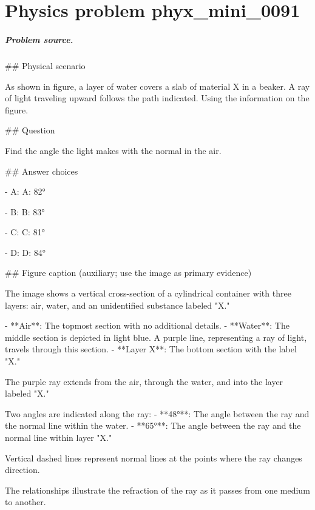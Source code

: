 
\chapter{Physics problem phyx\_mini\_0091}
\label{ch:PhyXMiniProblems_problem_phyx_mini_0091}

\paragraph{Problem source.}
\#\# Physical scenario

As shown in figure, a layer of water covers a slab of material X in a beaker. A ray of light traveling upward follows the path indicated. Using the information on the figure.

\#\# Question

Find the angle the light makes with the normal in the air.

\#\# Answer choices

- A: A: 82°

- B: B: 83°

- C: C: 81°

- D: D: 84°

\#\# Figure caption (auxiliary; use the image as primary evidence)

The image shows a vertical cross-section of a cylindrical container with three layers: air, water, and an unidentified substance labeled "X." 

- **Air**: The topmost section with no additional details.
- **Water**: The middle section is depicted in light blue. A purple line, representing a ray of light, travels through this section.
- **Layer X**: The bottom section with the label "X."

The purple ray extends from the air, through the water, and into the layer labeled "X." 

Two angles are indicated along the ray:
- **48°**: The angle between the ray and the normal line within the water.
- **65°**: The angle between the ray and the normal line within layer "X."

Vertical dashed lines represent normal lines at the points where the ray changes direction.

The relationships illustrate the refraction of the ray as it passes from one medium to another.

